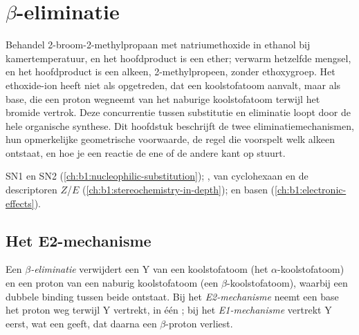 \chapter{\texorpdfstring{$\beta$}{Beta}-eliminatie}\label{ch:b1:elimination}

Behandel 2-broom-2-methylpropaan met natriumethoxide in ethanol bij
kamertemperatuur, en het hoofdproduct is een ether; verwarm hetzelfde
mengsel, en het hoofdproduct is een alkeen, 2-methylpropeen, zonder
ethoxygroep. Het ethoxide-ion heeft niet als  opgetreden, dat
een koolstofatoom aanvalt, maar als base, die een proton wegneemt van het
naburige koolstofatoom terwijl het bromide vertrok. Deze concurrentie
tussen substitutie en eliminatie loopt door de hele organische synthese.
Dit hoofdstuk beschrijft de twee eliminatiemechanismen, hun opmerkelijke
geometrische voorwaarde, de regel die voorspelt welk alkeen ontstaat, en
hoe je een reactie de ene of de andere kant op stuurt.

\begin{recall}
SN1 en SN2 (\cref{ch:b1:nucleophilic-substitution}); ,
 van cyclohexaan en de descriptoren $Z$/$E$
(\cref{ch:b1:stereochemistry-in-depth});  en basen
(\cref{ch:b1:electronic-effects}).
\end{recall}

\section{Het E2-mechanisme}

\begin{definition}\label{def:b1:elimination:elimination}
Een \emph{$\beta$-eliminatie}
verwijdert een  Y van een koolstofatoom (het
$\alpha$-koolstofatoom) en een proton van een naburig koolstofatoom (een
$\beta$-koolstofatoom), waarbij een dubbele binding tussen beide ontstaat.
Bij het \emph{E2-mechanisme} neemt een base het
proton weg terwijl Y vertrekt, in één ; bij het
\emph{E1-mechanisme} vertrekt Y eerst, wat een
 geeft, dat daarna een $\beta$-proton verliest.
\end{definition}

